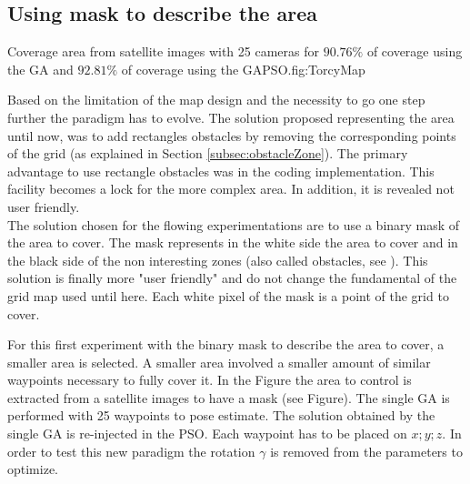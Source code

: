 
	
	\subsection{Using mask to describe the area }\label{sec:maskGAPSO}

\begin{mfigures}[!]
{Coverage area from satellite images with 25 cameras for $90.76\%$ of coverage using the GA and $92.81\%$ of coverage using the GAPSO.}{fig:TorcyMap} \centering
{}
\hspace{1cm}
\hspace{1cm}
\tabsimuposeTorcy
\end{mfigures}


Based on the limitation of the map design and the necessity to go one step further the paradigm has to evolve.
The solution proposed representing the area until now, was to add rectangles obstacles by removing the corresponding points of the grid (as explained in Section \ref{subsec:obstacleZone}). The primary advantage to use rectangle obstacles was in the coding implementation. 
This facility becomes a lock for the more complex area. In addition, it is revealed not user friendly.\\
 The solution chosen for the flowing experimentations are to use a binary mask of the area to cover. The mask represents in the white side the area to cover and in the black side of the non interesting zones (also called obstacles, see ). This solution is finally more "user friendly"  and do not change the fundamental of the grid map used until here. Each white pixel of the mask is a point of the grid to cover.  
 

For this first experiment with the binary mask to describe the area to cover, a smaller area is selected. A smaller area involved a smaller amount of similar waypoints necessary to fully cover it. In the Figure  the area to control is extracted from a satellite images to have a mask (see Figure). The single GA is performed  with 25 waypoints to pose estimate. The solution obtained by the single GA is re-injected in the PSO. Each waypoint has to be placed on $x; y; z$. In order to test this new paradigm the rotation $\gamma$ is removed from the parameters to optimize.

